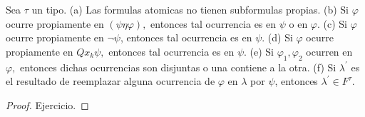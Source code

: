   \begin{lemma}
    Sea \(\tau \) un tipo.
    (a) Las formulas atomicas no tienen subformulas propias.
    (b) Si \(\varphi \) ocurre propiamente en \((\psi \eta \varphi ),\) entonces tal ocurrencia es en \(\psi \) o en \(\varphi .\)
    (c) Si \(\varphi \) ocurre propiamente en \(\lnot \psi \), entonces tal ocurrencia es en \(\psi .\)
    (d) Si \(\varphi \) ocurre propiamente en \(Qx_{k}\psi ,\) entonces tal ocurrencia es en \(\psi .\)
    (e) Si \(\varphi _{1},\varphi _{2}\) ocurren en \(\varphi ,\) entonces dichas ocurrencias son disjuntas o una contiene a la otra.
    (f) Si \(\lambda ^{\prime }\) es el resultado de reemplazar alguna ocurrencia de \(\varphi \) en \(\lambda \) por \(\psi \), entonces \(\lambda ^{\prime }\in F^{\tau }\).
  \end{lemma}
  \begin{proof}
    Ejercicio.
  \end{proof}
